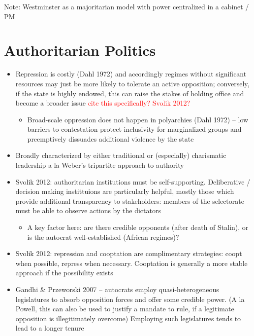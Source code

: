 \documentclass[12pt]{article}
\begin{document}
Note: Westminster as a majoritarian model with power centralized in a cabinet / PM




\section*{Authoritarian Politics}

\begin{itemize}
    \item Repression is costly (Dahl 1972) and accordingly regimes without significant resources may just be more likely to tolerate an active opposition; conversely, if the state is highly endowed, this can raise the stakes of holding office and become a broader issue \textcolor{red}{cite this specifically? Svolik 2012?}
    \begin{itemize}
        \item Broad-scale oppression does not happen in polyarchies (Dahl 1972) -- low barriers to contestation protect inclusivity for marginalized groups and preemptively dissuades additional violence by the state
    \end{itemize}
    \item Broadly characterized by either traditional or (especially) charismatic leadership a la Weber's tripartite approach to authority
    \item Svolik 2012: authoritarian institutions must be self-supporting. Deliberative / decision making instittuions are particularly helpful, mostly those which provide additional transparency to stakeholders: members of the selectorate must be able to observe actions by the dictators
    \begin{itemize}
        \item A key factor here: are there credible opponents (after death of Stalin), or is the autocrat well-established (African regimes)?
    \end{itemize}
    \item Svolik 2012: repression and cooptation are complimentary strategies: coopt when possible, repress when necessary. Cooptation is generally a more stable approach if the possibility exists
    \item Gandhi \& Przeworski 2007 -- autocrats employ quasi-heterogeneous legislatures to absorb opposition forces and offer some credible power. (A la Powell, this can also be used to justify a mandate to rule, if a legitimate opposition is illegitimately overcome) Employing such legislatures tends to lead to a longer tenure

\end{itemize}
\end{document}
